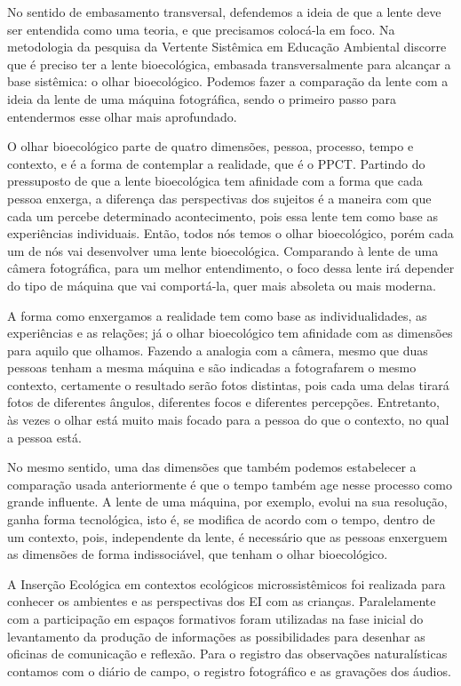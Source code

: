 \documentclass{textolivre-html}
\begin{document}
No sentido de embasamento transversal, defendemos a ideia de que a lente deve ser entendida como uma teoria, e que precisamos colocá-la em foco. Na metodologia da pesquisa da Vertente Sistêmica em Educação Ambiental \cite{piske2018b,piske2019} discorre que é preciso ter a lente bioecológica, embasada transversalmente para alcançar a base sistêmica: o olhar bioecológico. Podemos fazer a comparação da lente com a ideia da lente de uma máquina fotográfica, sendo o primeiro passo para entendermos esse olhar mais aprofundado.

O olhar bioecológico parte de quatro dimensões, pessoa, processo, tempo e contexto, e é a forma de contemplar a realidade, que é o PPCT. Partindo do pressuposto de que a lente bioecológica tem afinidade com a forma que cada pessoa enxerga, a diferença das perspectivas dos sujeitos é a maneira com que cada um percebe determinado acontecimento, pois essa lente tem como base as experiências individuais. Então, todos nós temos o olhar bioecológico, porém cada um de nós vai desenvolver uma lente bioecológica. Comparando à lente de uma câmera fotográfica, para um melhor entendimento, o foco dessa lente irá depender do tipo de máquina que vai comportá-la, quer mais absoleta ou mais moderna. 

A forma como enxergamos a realidade tem como base as individualidades, as experiências e as relações; já o olhar bioecológico tem afinidade com as dimensões para aquilo que olhamos. Fazendo a analogia com a câmera, mesmo que duas pessoas tenham a mesma máquina e são indicadas a fotografarem o mesmo contexto, certamente o resultado serão fotos distintas, pois cada uma delas tirará fotos de diferentes ângulos, diferentes focos e diferentes percepções. Entretanto, às vezes o olhar está muito mais focado para a pessoa do que o contexto, no qual a pessoa está.

No mesmo sentido, uma das dimensões que também podemos estabelecer a comparação usada anteriormente é que o tempo também age nesse processo como grande influente. A lente de uma máquina, por exemplo, evolui na sua resolução, ganha forma tecnológica, isto é, se modifica de acordo com o tempo, dentro de um contexto, pois, independente da lente, é necessário que as pessoas enxerguem as dimensões de forma indissociável, que tenham o olhar bioecológico.

A Inserção Ecológica em contextos ecológicos microssistêmicos foi realizada para conhecer os ambientes e as perspectivas dos EI com as crianças. Paralelamente com a participação em espaços formativos foram utilizadas na fase inicial do levantamento da produção de informações as possibilidades para desenhar as oficinas de comunicação e reflexão. Para o registro das observações naturalísticas contamos com o diário de campo, o registro fotográfico e as gravações dos áudios.
\end{document}
